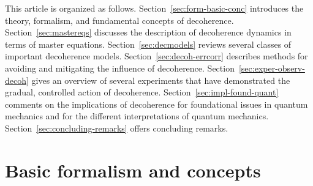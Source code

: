 \documentclass[3p,sort&compress,12pt]{elsarticle}
\begin{document}
This article is organized as follows. Section~\ref{sec:form-basic-conc} introduces the theory, formalism, and fundamental concepts of decoherence. Section~\ref{sec:mastereqs} discusses the description of decoherence dynamics in terms of master equations. Section~\ref{sec:decmodels} reviews several classes of important decoherence models. Section~\ref{sec:decoh-errcorr} describes methods for avoiding and mitigating the influence of decoherence. Section~\ref{sec:exper-observ-decoh} gives an overview of several experiments that have demonstrated the gradual, controlled action of decoherence. Section~\ref{sec:impl-found-quant} comments on the implications of decoherence for foundational issues in quantum mechanics and for the different interpretations of quantum mechanics. Section~\ref{sec:concluding-remarks} offers concluding remarks.

\section{\label{sec:form-basic-conc}Basic formalism and concepts}
\end{document}

